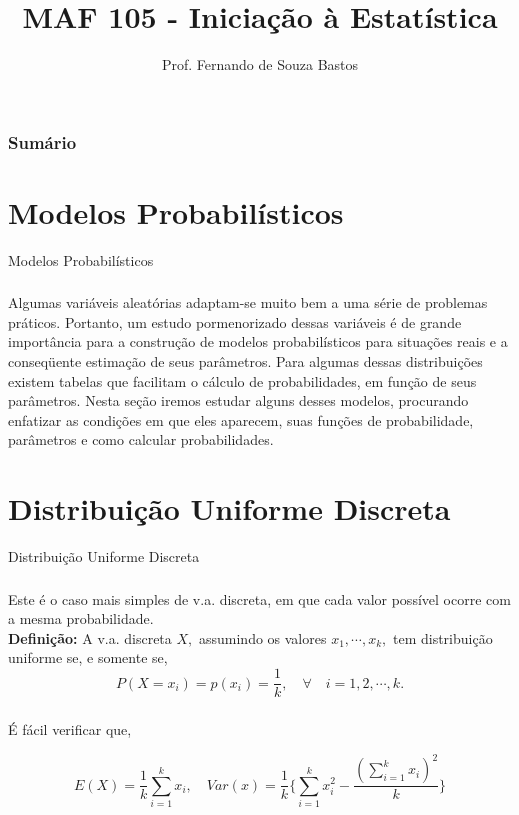 \documentclass[14pt,aspectratio=1610]{beamer}
\title{MAF 105 - Iniciação à Estatística}
\author{Prof. Fernando de Souza Bastos}
\institute{Instituto de Ciências Exatas e Tecnológicas\texorpdfstring{\\ Universidade Federal de Viçosa}{}\texorpdfstring{\\ Campus UFV - Florestal}{}}
\date[\today]{}
\begin{document}


\frame{\titlepage}

\begin{frame}{}
\frametitle{\bf Sumário}
\tableofcontents
\end{frame}

\section{Modelos Probabilísticos}
\begin{frame}{Modelos Probabilísticos}
\frametitle{}
\begin{block}{}
\justifying
Algumas variáveis aleatórias adaptam-se muito bem a uma série de problemas
práticos. Portanto, um estudo pormenorizado dessas variáveis é de grande importância
para a construção de modelos probabilísticos para si\-tua\-ções reais e a conseqüente
estimação de seus parâmetros. Para algumas dessas distribuições existem tabelas que
facilitam o cálculo de probabilidades, em função de seus parâmetros. Nesta seção
iremos estudar alguns desses modelos, procurando enfatizar as condições em que eles
aparecem, suas funções de probabilidade, parâmetros e como calcular probabilidades.
\end{block}
\end{frame}

\section{Distribuição Uniforme Discreta}
\begin{frame}{Distribuição Uniforme Discreta}
\frametitle{}
\begin{block}{}
\justifying
Este é o caso mais simples de v.a. discreta, em que cada valor possível ocorre com
a mesma probabilidade.\\
{\bf Definição:} A v.a. discreta $X,$ assumindo os valores $x_{1},\cdots, x_{k},$ tem distribuição uniforme se, e somente se,
$$P(X=x_{i})=p(x_{i})=\dfrac{1}{k},\quad \forall\quad i=1,2,\cdots,k.$$
\end{block}
\end{frame}

\begin{frame}{}
\frametitle{}
\begin{block}{}
\justifying
É fácil verificar que,

$$
E(X)=\dfrac{1}{k}{\displaystyle \sum_{i=1}^{k}x_{i}},\quad 
Var(x)=\dfrac{1}{k}\Biggl\{{\displaystyle \sum_{i=1}^{k}x_{i}^{2}}-\dfrac{{\displaystyle\left(\sum_{i=1}^{k}x_{i}\right)^{2}}}{k} \Biggl\}
$$

\end{block}
\end{frame}
\end{document}

